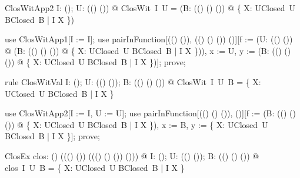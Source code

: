 \documentclass{article}
\begin{document}
\begin{theorem}{ClosWitApp2}
  \forall I: \power (\nat \fun \nat); U: \power ((\nat \fun \nat) \fun (\nat \fun \nat)) @ ClosWit~I~U = (\lambda B: \power ((\nat \fun \nat) \cross (\nat \fun \nat) \fun (\nat \fun \nat)) @ \bigcap \{ X: UClosed~U \cap BClosed~B | I \subseteq X \})
\end{theorem}

\begin{zproof}
use ClosWitApp1[I := I];
use pairInFunction[\power ((\nat \fun \nat) \fun (\nat \fun \nat)), \power ((\nat \fun \nat) \cross (\nat \fun \nat) \fun (\nat \fun \nat)) \fun \power (\nat \fun \nat)][f := (\lambda U: \power ((\nat \fun \nat) \fun (\nat \fun \nat)) @ (\lambda B: \power ((\nat \fun \nat) \cross (\nat \fun \nat) \fun (\nat \fun \nat)) @ \bigcap \{ X: UClosed~U \cap BClosed~B | I \subseteq X \})), x := U, y := (\lambda B: \power ((\nat \fun \nat) \cross (\nat \fun \nat) \fun (\nat \fun \nat)) @ \bigcap \{ X: UClosed~U \cap BClosed~B | I \subseteq X \})];
prove;
\end{zproof}

\begin{theorem}{rule ClosWitVal}
  \forall I: \power (\nat \fun \nat); U: \power ((\nat \fun \nat) \fun (\nat \fun \nat)); B: \power ((\nat \fun \nat) \cross (\nat \fun \nat) \fun (\nat \fun \nat)) @ ClosWit~I~U~B = \bigcap \{ X: UClosed~U \cap BClosed~B | I \subseteq X \}
\end{theorem}

\begin{zproof}
use ClosWitApp2[I := I, U := U];
use pairInFunction[\power ((\nat \fun \nat) \cross (\nat \fun \nat) \fun (\nat \fun \nat)), \power (\nat \fun \nat)][f := (\lambda B: \power ((\nat \fun \nat) \cross (\nat \fun \nat) \fun (\nat \fun \nat)) @ \bigcap \{ X: UClosed~U \cap BClosed~B | I \subseteq X \}), x := B, y := \bigcap \{ X: UClosed~U \cap BClosed~B | I \subseteq X \}];
prove;
\end{zproof}

\begin{theorem}{ClosEx}
  \exists clos: \power (\nat \fun \nat) \fun (\power ((\nat \fun \nat) \fun (\nat \fun \nat)) \fun (\power ((\nat \fun \nat) \cross (\nat \fun \nat) \fun (\nat \fun \nat)) \fun \power (\nat \fun \nat))) @ \forall I: \power (\nat \fun \nat); U: \power ((\nat \fun \nat) \fun (\nat \fun \nat)); B: \power ((\nat \fun \nat) \cross (\nat \fun \nat) \fun (\nat \fun \nat)) @ clos~I~U~B = \bigcap \{ X: UClosed~U \cap BClosed~B | I \subseteq X \}
\end{theorem}
\end{document}
